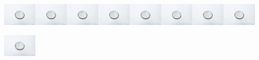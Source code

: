 \begin{escolha}
\begin{escolha}
{{{{\includegraphics[width=0.65539in,height=0.60039in]{media/image119.jpeg}\includegraphics[width=0.65539in,height=0.60039in]{media/image119.jpeg}\includegraphics[width=0.65539in,height=0.60039in]{media/image119.jpeg}\includegraphics[width=0.65539in,height=0.60039in]{media/image119.jpeg}\includegraphics[width=0.65539in,height=0.60039in]{media/image119.jpeg}\includegraphics[width=0.65539in,height=0.60039in]{media/image119.jpeg}\includegraphics[width=0.65539in,height=0.60039in]{media/image119.jpeg}\includegraphics[width=0.65539in,height=0.60039in]{media/image119.jpeg}\includegraphics[width=0.65539in,height=0.60039in]{media/image119.jpeg}

}}}}
\end{escolha}
\end{escolha}
